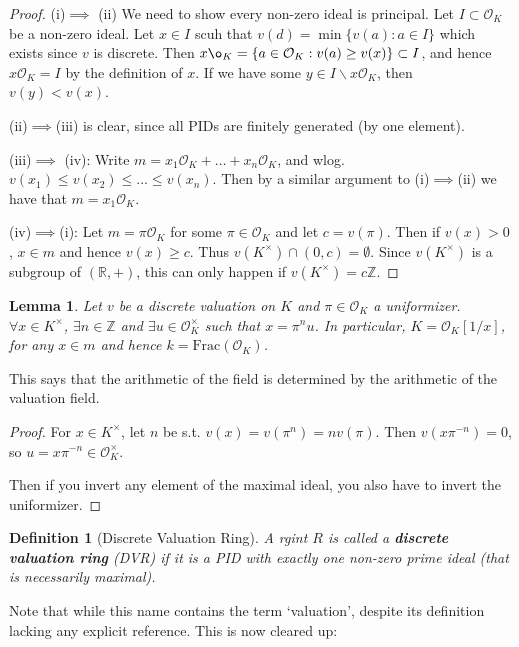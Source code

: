 \documentclass[]{article}
\theoremstyle{custhm}
\theoremstyle{cusdef}
\newtheorem{defin}[theorem]{Definition}
\theoremstyle{custhm}
\newtheorem{lemma}[theorem]{Lemma}
\theoremstyle{custhm}
\theoremstyle{custhm}
\theoremstyle{custhm}
\theoremstyle{cusdef}
\theoremstyle{remark}
\newcommand{\Z}{\mathbb{Z}}
\newcommand{\R}{\mathbb{R}}
\newcommand{\undf}[1]{\textit{\textbf{#1}}}
\renewcommand{\O}{\mathcal{O}}
\begin{document}
\begin{proof}
(i)$\implies$ (ii) We need to show every non-zero ideal is principal. Let $I\subset \O_K$ be a non-zero ideal. Let $x\in I$ scuh that $v(d) = \min \{v(a):a\in I\}$ which exists since $v$ is discrete.  Then $x\o_K = \{a\in \O_K : v(a)\ge v(x)\}\subset I$, and hence $x\O_K = I$ by the definition of $x$. If we have some $y\in I\backslash x\O_K$, then $v(y) < v(x)$.

(ii)$\implies$(iii) is clear, since all PIDs are finitely generated (by one element).

(iii)$\implies$ (iv): Write $m = x_1\O_K + \dots+x_n\O_K$, and wlog. $v(x_1)\le v(x_2)\le \dots \le v(x_n)$. Then by a similar argument to (i)$\implies$(ii) we have that $m = x_1\O_K$.

(iv)$\implies$(i): Let $m = \pi\O_K$ for some $\pi \in \O_K$ and let $c = v(\pi)$. Then if $v(x) > 0$, $x\in m$ and hence $v(x)\ge c$. Thus $v(K^\times)\cap(0,c) = \emptyset$. Since $v(K^\times)$ is a subgroup of $(\R,+)$, this can only happen if $v(K^\times) = c\Z$.
\end{proof}
\begin{lemma}
	Let $v$ be a discrete valuation on $K$ and $\pi \in \O_K$ a uniformizer. $\forall x \in K^\times$, $\exists n\in \Z$ and $\exists u\in \O_K^\times$ such that $x = \pi^n u$. In particular, $K = \O_K[1/x]$, for any $x\in m$ and hence $k = \textrm{Frac}(\O_K)$.
\end{lemma}
This says that the arithmetic of the field is determined by the arithmetic of the valuation field.
\begin{proof}
For $x \in K^\times$, let $n$ be s.t. $v(x) = v(\pi^n) = nv(\pi)$. Then $v(x\pi^{-n}) = 0$, so $u = x\pi^{-n}\in \O_K^\times$.

Then if you invert any element of the maximal ideal, you also have to invert the uniformizer.
\end{proof}
\begin{defin}[Discrete Valuation Ring]
A rgint $R$ is called a \undf{discrete valuation ring} (DVR) if it is a PID with exactly one non-zero prime ideal (that is necessarily maximal).
\end{defin}
Note that while this name contains the term `valuation', despite its definition lacking any explicit reference. This is now cleared up:
\end{document}
